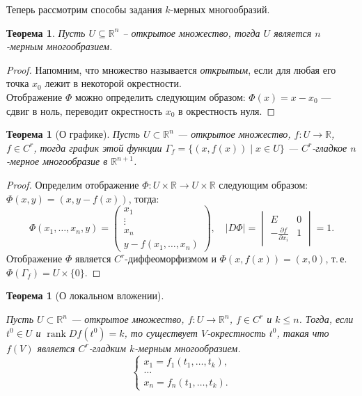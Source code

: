 \documentclass[a5paper]{article}
\newcounter{through}
\theoremstyle{plain}
\newtheorem{theorem}[through]{Теорема}
\theoremstyle{definition}
\numberwithin{through}{section}
\numberwithin{equation}{section}
\DeclareMathOperator{\rank}{rank}
\begin{document}
Теперь рассмотрим способы задания $k$-мерных многообразий.

\begin{theorem}%
	\label{OpenSetManifold}
	Пусть $U \subseteq \mathbb{R}^n$ -- открытое множество, тогда $U$ является
	$n$-мерным многообразием.
\end{theorem} 
\begin{proof}
	Напомним, что множество называется \textit{открытым}, если для любая его точка $x_0$ лежит в некоторой окрестности.\\
	Отображение $\Phi$ можно определить следующим образом:
	$\Phi(x)=x-x_0$ --- сдвиг в ноль, переводит окрестность $x_0$ в окрестность нуля.
\end{proof}

\begin{theorem}[О графике]
	Пусть $U \subset \mathbb{R}^n$ --- открытое множество, $f: U \to \mathbb{R}$, $f \in C^r$, тогда график этой функции $\Gamma_f =
	\{ (x, f(x))  \mid x \in U \}$ --- $C^r$-гладкое $n$-мерное многообразие в $\mathbb{R}^{n+1}$.
\end{theorem}

\begin{proof}
	Определим отображение $\Phi : U \times \mathbb{R} \to U \times \mathbb{R}$ следующим образом: $\Phi(x, y) = (x, y - f(x))$, тогда:
\[
\Phi(x_1, \ldots, x_n, y) =
	\begin{pmatrix}
	x_1 \\
	\vdots \\
	x_n \\
	y - f(x_1, \ldots, x_n)
	\end{pmatrix},
	\quad
	\left| D \Phi \right|=
	\begin{vmatrix}
	E& 0 \\
	-\frac{\partial f}{\partial x_i} & 1
	\end{vmatrix}
	= 1.
\]
	Отображение $\Phi$ является $C^r$-диффеоморфизмом и $\Phi(x,f(x)) = (x, 0)$, т.\,е. $\Phi(\Gamma_f) = U \times \{0\}$.
\end{proof}

\begin{theorem}[О локальном вложении]\label{thParamManifold}

	Пусть $U \subset \mathbb{R}^n$ --- открытое множество, $f: U \to \mathbb{R}^n$, $f \in C^r$ и $k \leq n $. Тогда, если $t^0 \in U$ и $\rank Df(t^0) = k$, то существует $V$-окрестность $t^0$, такая что $f(V)$ является $C^r$-гладким $k$-мерным многообразием.
		\begin{equation*}
	\begin{cases}
	x_1 = f_1(t_1,\ldots,t_k), \\
	\ldots \\
	x_n = f_n(t_1,\ldots, t_k).
	\end{cases}
	\end{equation*}
\end{theorem}
\end{document}
